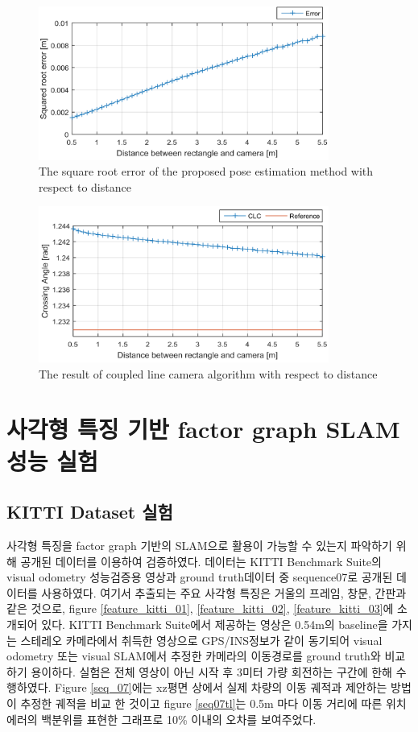 \documentclass[master,korean,final]{cbnu-ecs}
\begin{document}
\begin{figure}[!ht]
  \centering
	\includegraphics[width=360px]{img/RMS_d.png}
  \caption{The square root error of the proposed pose estimation method with respect to distance}
\label{RMS_d}
\end{figure}
\begin{figure}[!ht]
  \centering
	\includegraphics[width=360px]{img/ca_d.png}
  \caption{The result of coupled line camera algorithm with respect to distance }
\label{ca_d}
\end{figure}

\clearpage

\section{사각형 특징 기반 factor graph SLAM 성능 실험}
\subsection{KITTI Dataset 실험}
사각형 특징을 factor graph 기반의 SLAM으로 활용이 가능할 수 있는지 파악하기 위해 공개된 데이터를 이용하여 검증하였다. 데이터는 KITTI Benchmark Suite의 visual odometry 성능검증용 영상과 ground truth데이터 중 sequence07로 공개된 데이터를 사용하였다. 여기서 추출되는 주요 사각형 특징은  거울의 프레임, 창문, 간판과 같은 것으로, figure \ref{feature_kitti_01}, \ref{feature_kitti_02}, \ref{feature_kitti_03}에 소개되어 있다. KITTI Benchmark Suite에서 제공하는 영상은 0.54m의 baseline을 가지는 스테레오 카메라에서 취득한 영상으로 GPS/INS정보가 같이 동기되어 visual odometry 또는 visual SLAM에서 추정한 카메라의 이동경로를 ground truth와 비교하기 용이하다. 실험은 전체 영상이 아닌 시작 후 3미터 가량 회전하는 구간에 한해 수행하였다. Figure \ref{seq_07}에는 xz평면 상에서 실제 차량의 이동 궤적과 제안하는 방법이 추정한 궤적을 비교 한 것이고 figure \ref{seq07tl}는 0.5m 마다 이동 거리에 따른 위치 에러의 백분위를 표현한 그래프로 10\% 이내의 오차를 보여주었다. 
\clearpage
\end{document}
